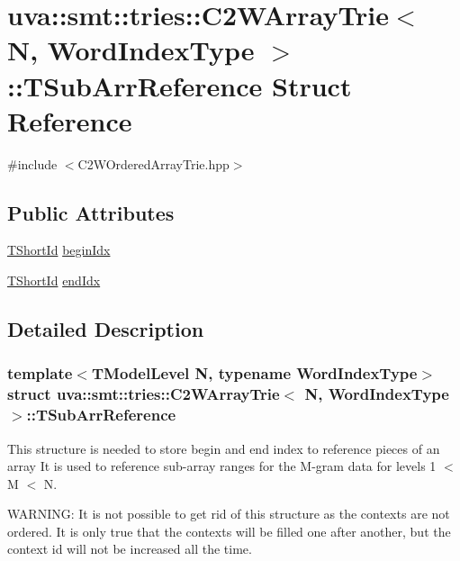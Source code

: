 \hypertarget{structuva_1_1smt_1_1tries_1_1_c2_w_array_trie_1_1_t_sub_arr_reference}{}\section{uva\+:\+:smt\+:\+:tries\+:\+:C2\+W\+Array\+Trie$<$ N, Word\+Index\+Type $>$\+:\+:T\+Sub\+Arr\+Reference Struct Reference}
\label{structuva_1_1smt_1_1tries_1_1_c2_w_array_trie_1_1_t_sub_arr_reference}


{\ttfamily \#include $<$C2\+W\+Ordered\+Array\+Trie.\+hpp$>$}

\subsection*{Public Attributes}
\begin{DoxyCompactItemize}
\item 
\hyperlink{namespaceuva_1_1smt_1_1hashing_adcf22e1982ad09d3a63494c006267469}{T\+Short\+Id} \hyperlink{structuva_1_1smt_1_1tries_1_1_c2_w_array_trie_1_1_t_sub_arr_reference_a54b06953fa51f7646c7f491ee4d99372}{begin\+Idx}
\item 
\hyperlink{namespaceuva_1_1smt_1_1hashing_adcf22e1982ad09d3a63494c006267469}{T\+Short\+Id} \hyperlink{structuva_1_1smt_1_1tries_1_1_c2_w_array_trie_1_1_t_sub_arr_reference_a1e7dd8f7b6007d10bb6b888eec498ec0}{end\+Idx}
\end{DoxyCompactItemize}


\subsection{Detailed Description}
\subsubsection*{template$<$T\+Model\+Level N, typename Word\+Index\+Type$>$struct uva\+::smt\+::tries\+::\+C2\+W\+Array\+Trie$<$ N, Word\+Index\+Type $>$\+::\+T\+Sub\+Arr\+Reference}

This structure is needed to store begin and end index to reference pieces of an array It is used to reference sub-\/array ranges for the M-\/gram data for levels 1 $<$ M $<$ N.

W\+A\+R\+N\+I\+N\+G\+: It is not possible to get rid of this structure as the contexts are not ordered. It is only true that the contexts will be filled one after another, but the context id will not be increased all the time.


